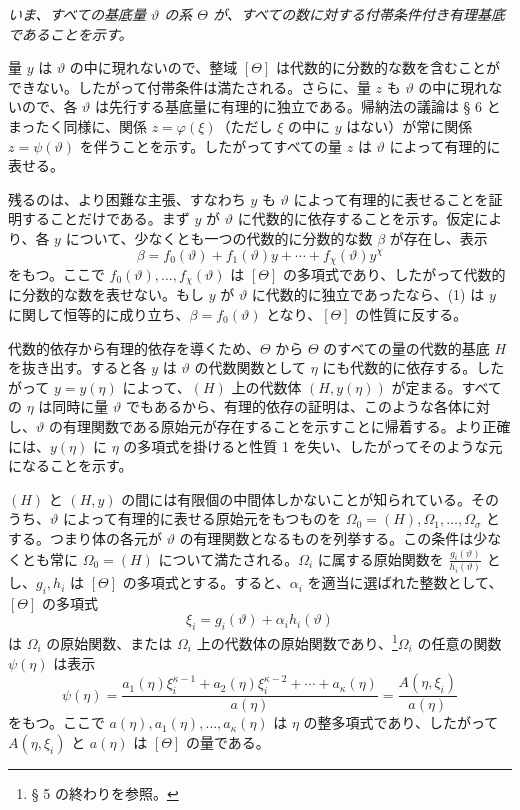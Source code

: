 \documentclass[11pt]{article}
\begin{document}
\emph{いま、すべての基底量 $\vartheta$ の系 $\Theta$ が、すべての数に対する付帯条件付き有理基底であることを示す。}

量 $y$ は $\vartheta$ の中に現れないので、整域 $[\Theta]$ は代数的に分数的な数を含むことができない。したがって付帯条件は満たされる。さらに、量 $z$ も $\vartheta$ の中に現れないので、各 $\vartheta$ は先行する基底量に有理的に独立である。帰納法の議論は § 6 とまったく同様に、関係 $z=\varphi(\xi)$（ただし $\xi$ の中に $y$ はない）が常に関係 $z=\psi(\vartheta)$ を伴うことを示す。したがってすべての量 $z$ は $\vartheta$ によって有理的に表せる。

残るのは、より困難な主張、すなわち $y$ も $\vartheta$ によって有理的に表せることを証明することだけである。まず $y$ が $\vartheta$ に代数的に依存することを示す。仮定により、各 $y$ について、少なくとも一つの代数的に分数的な数 $\beta$ が存在し、表示
\begin{equation}
\beta=f_0(\vartheta)+f_1(\vartheta)y+\cdots+f_\chi(\vartheta)y^\chi
\tag{1}
\end{equation}
をもつ。ここで $f_0(\vartheta),\ldots,f_\chi(\vartheta)$ は $[\Theta]$ の多項式であり、したがって代数的に分数的な数を表せない。もし $y$ が $\vartheta$ に代数的に独立であったなら、(1) は $y$ に関して恒等的に成り立ち、$\beta=f_0(\vartheta)$ となり、$[\Theta]$ の性質に反する。

代数的依存から有理的依存を導くため、$\Theta$ から $\Theta$ のすべての量の代数的基底 $H$ を抜き出す。すると各 $y$ は $\vartheta$ の代数関数として $\eta$ にも代数的に依存する。したがって $y=y(\eta)$ によって、$(H)$ 上の代数体 $(H,y(\eta))$ が定まる。すべての $\eta$ は同時に量 $\vartheta$ でもあるから、有理的依存の証明は、このような各体に対し、$\vartheta$ の有理関数である原始元が存在することを示すことに帰着する。より正確には、$y(\eta)$ に $\eta$ の多項式を掛けると性質 1 を失い、したがってそのような元になることを示す。

$(H)$ と $(H,y)$ の間には有限個の中間体しかないことが知られている。そのうち、$\vartheta$ によって有理的に表せる原始元をもつものを $\Omega_0=(H),\Omega_1,\ldots,\Omega_\sigma$ とする。つまり体の各元が $\vartheta$ の有理関数となるものを列挙する。この条件は少なくとも常に $\Omega_0=(H)$ について満たされる。$\Omega_i$ に属する原始関数を $\frac{g_i(\vartheta)}{h_i(\vartheta)}$ とし、$g_i,h_i$ は $[\Theta]$ の多項式とする。すると、$\alpha_i$ を適当に選ばれた整数として、$[\Theta]$ の多項式
\[
 \xi_i=g_i(\vartheta)+\alpha_i h_i(\vartheta)
\]
は $\Omega_i$ の原始関数、または $\Omega_i$ 上の代数体の原始関数であり、\footnote{§ 5 の終わりを参照。}$\Omega_i$ の任意の関数 $\psi(\eta)$ は表示
\begin{equation}
\psi(\eta)=
\frac{a_1(\eta)\xi_i^{\kappa-1}+a_2(\eta)\xi_i^{\kappa-2}+\cdots+a_\kappa(\eta)}
     {a(\eta)}
=\frac{A(\eta,\xi_i)}{a(\eta)}
\tag{2}
\end{equation}
をもつ。ここで $a(\eta),a_1(\eta),\ldots,a_\kappa(\eta)$ は $\eta$ の整多項式であり、したがって $A(\eta,\xi_i)$ と $a(\eta)$ は $[\Theta]$ の量である。
\end{document}
